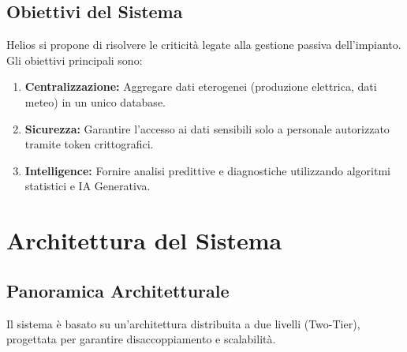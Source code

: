 \documentclass[a4paper,12pt]{report}
\begin{document}
\section{Obiettivi del Sistema}
Helios si propone di risolvere le criticità legate alla gestione passiva dell'impianto. Gli obiettivi principali sono:
\begin{enumerate}
    \item \textbf{Centralizzazione:} Aggregare dati eterogenei (produzione elettrica, dati meteo) in un unico database.
    \item \textbf{Sicurezza:} Garantire l'accesso ai dati sensibili solo a personale autorizzato tramite token crittografici.
    \item \textbf{Intelligence:} Fornire analisi predittive e diagnostiche utilizzando algoritmi statistici e IA Generativa.
\end{enumerate}

\chapter{Architettura del Sistema}

\section{Panoramica Architetturale}
Il sistema è basato su un'architettura distribuita a due livelli (Two-Tier), progettata per garantire disaccoppiamento e scalabilità.
\end{document}
